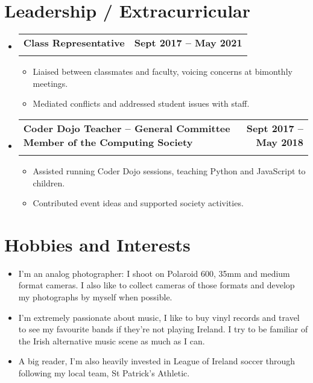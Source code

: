 \documentclass[letterpaper,11pt]{article}
\makeatletter
\newcommand{\resumeItem}[1]{
  \item\small{
    {#1 \vspace{-2pt}}
  }
}
\newcommand{\resumeSubheading}[4]{
  \vspace{-2pt}\item
    \begin{tabular*}{1.0\textwidth}[t]{l@{\extracolsep{\fill}}r}
      \textbf{#1} & \textbf{\small #2} \\
      \textit{\small#3} & \textit{\small #4} \\
    \end{tabular*}\vspace{-7pt}
}
\newcommand{\resumeSubHeadingListStart}{\begin{itemize}[leftmargin=0.0in, label={}]}
\newcommand{\resumeSubHeadingListEnd}{\end{itemize}}
\newcommand{\resumeItemListStart}{\begin{itemize}}
\newcommand{\resumeItemListEnd}{\end{itemize}\vspace{-5pt}}
\makeatother
\begin{document}
\section{Leadership / Extracurricular}
\vspace{2pt}
\resumeSubHeadingListStart
\resumeSubheading{Class Representative}{Sept 2017 -- May 2021}{}{}
\vspace{-15pt}
\resumeItemListStart
\resumeItem{Liaised between classmates and faculty, voicing concerns at bimonthly meetings.}
\resumeItem{Mediated conflicts and addressed student issues with staff.}
\resumeItemListEnd
\resumeSubHeadingListEnd
\vspace{-8pt}
\resumeSubHeadingListStart
\resumeSubheading{Coder Dojo Teacher -- General Committee Member of the Computing Society}{Sept 2017 -- May 2018}{}{}
\vspace{-15pt}
\resumeItemListStart
\resumeItem{Assisted running Coder Dojo sessions, teaching Python and JavaScript to children.}
\resumeItem{Contributed event ideas and supported society activities.}
\resumeItemListEnd
\resumeSubHeadingListEnd


\section{Hobbies and Interests}

\resumeItemListStart
\vspace{2pt}
\resumeItem{I'm an analog photographer: I shoot on Polaroid 600, 35mm and medium format cameras. I also like to collect cameras of those formats and develop my photographs by myself when possible.}
\vspace{-2pt}
\resumeItem{I'm extremely passionate about music, I like to buy vinyl records and travel to see my favourite bands if they're not playing Ireland. I try to be familiar of the Irish alternative music scene as much as I can. }
\vspace{-2pt}
\resumeItem{A big reader, I'm also heavily invested in League of Ireland soccer through following my local team, St Patrick's Athletic. }
\vspace{-2pt}
\resumeItemListEnd
\end{document}
